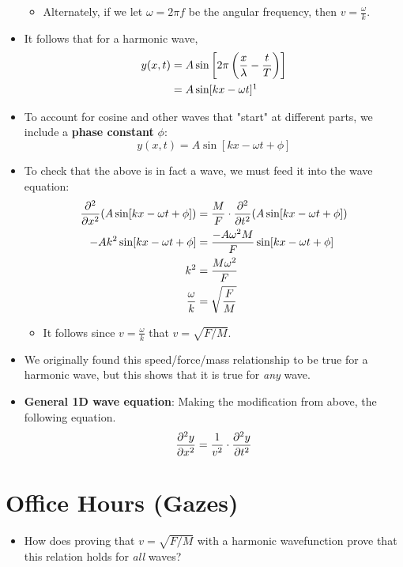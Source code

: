 \documentclass[../notes.tex]{subfiles}
\begin{document}
\begin{itemize}
\begin{itemize}
        \item Alternately, if we let $\omega=2\pi f$ be the angular frequency, then $v=\frac{\omega}{k}$.
    \end{itemize}
    \item It follows that for a harmonic wave,
    \begin{align*}
        y(x,t) &= A\sin\left[ 2\pi\left( \frac{x}{\lambda}-\frac{t}{T} \right) \right]\\
        &= A\sin[kx-\omega t]\footnotemark
    \end{align*}
    \item To account for cosine and other waves that "start" at different parts, we include a \textbf{phase constant} $\phi$:
    \begin{equation*}
        y(x,t) = A\sin[kx-\omega t+\phi]
    \end{equation*}
    \item To check that the above is in fact a wave, we must feed it into the wave equation:
    \begin{align*}
        \pdv[2]{x}(A\sin[kx-\omega t+\phi]) &= \frac{M}{F}\cdot\pdv[2]{t}(A\sin[kx-\omega t+\phi])\\
        -Ak^2\sin[kx-\omega t+\phi] &= \frac{-A\omega^2M}{F}\sin[kx-\omega t+\phi]\\
        k^2 &= \frac{M\omega^2}{F}\\
        \frac{\omega}{k} &= \sqrt{\frac{F}{M}}
    \end{align*}
    \begin{itemize}
        \item It follows since $v=\frac{\omega}{k}$ that $v=\sqrt{F/M}$.
    \end{itemize}
    \item We originally found this speed/force/mass relationship to be true for a harmonic wave, but this shows that it is true for \emph{any} wave.
    \item \textbf{General 1D wave equation}: Making the modification from above, the following equation.
    \begin{equation*}
        \pdv[2]{y}{x} = \frac{1}{v^2}\cdot\pdv[2]{y}{t}
    \end{equation*}
\end{itemize}



\section{Office Hours (Gazes)}
\begin{itemize}
    \item How does proving that $v=\sqrt{F/M}$ with a harmonic wavefunction prove that this relation holds for \emph{all} waves?
\end{itemize}
\end{document}
